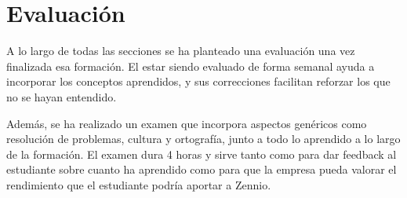\section{Evaluación}
\label{sec:Evalucion}
A lo largo de todas las secciones se ha planteado una evaluación una vez finalizada esa formación. El estar siendo evaluado de forma semanal ayuda a incorporar los conceptos aprendidos, y sus correcciones facilitan reforzar los que no se hayan entendido.

Además, se ha realizado un examen que incorpora aspectos genéricos como resolución de problemas, cultura y ortografía, junto a todo lo aprendido a lo largo de la formación. El examen dura 4 horas y sirve tanto como para dar feedback al estudiante sobre cuanto ha aprendido como para que la empresa pueda valorar el rendimiento que el estudiante podría aportar a Zennio.
